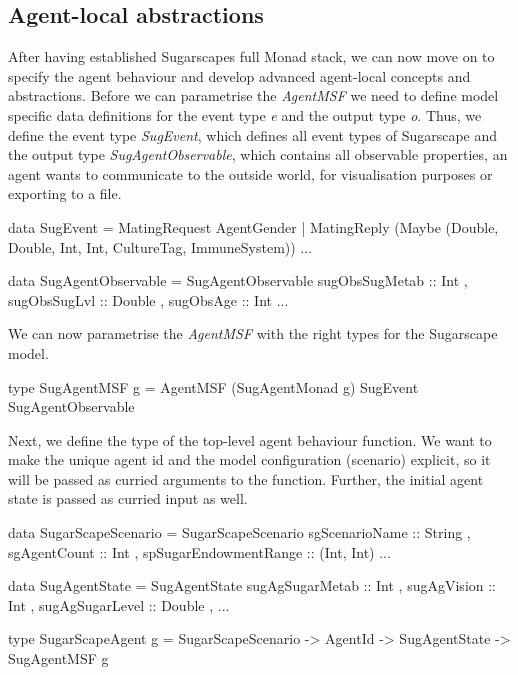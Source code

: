 \subsection{Agent-local abstractions}
After having established Sugarscapes full Monad stack, we can now move on to specify the agent behaviour and develop advanced agent-local concepts and abstractions. Before we can parametrise the \textit{AgentMSF} we need to define model specific data definitions for the event type \textit{e} and the output type \textit{o}. Thus, we define the event type \textit{SugEvent}, which defines all event types of Sugarscape and the output type \textit{SugAgentObservable}, which contains all observable properties, an agent wants to communicate to the outside world, for visualisation purposes or exporting to a file. 

\begin{HaskellCode}
data SugEvent = MatingRequest AgentGender
              | MatingReply 
                 (Maybe (Double, Double, Int, Int, CultureTag, ImmuneSystem))
              ...

data SugAgentObservable = SugAgentObservable
  { sugObsSugMetab :: Int
  , sugObsSugLvl   :: Double
  , sugObsAge      :: Int
  ...  
  }
\end{HaskellCode}

We can now parametrise the \textit{AgentMSF} with the right types for the Sugarscape model.

\begin{HaskellCode}
type SugAgentMSF g = AgentMSF (SugAgentMonad g) SugEvent SugAgentObservable
\end{HaskellCode}

Next, we define the type of the top-level agent behaviour function. We want to make the unique agent id and the model configuration (scenario) explicit, so it will be passed as curried arguments to the function. Further, the initial agent state is passed as curried input as well.

\begin{HaskellCode}
data SugarScapeScenario = SugarScapeScenario 
  { sgScenarioName        :: String
  , sgAgentCount          :: Int
  , spSugarEndowmentRange :: (Int, Int)
  ...
  }

data SugAgentState = SugAgentState
  { sugAgSugarMetab :: Int
  , sugAgVision     :: Int
  , sugAgSugarLevel :: Double
  , ...
  }
  
type SugarScapeAgent g 
  = SugarScapeScenario -> AgentId -> SugAgentState -> SugAgentMSF g
\end{HaskellCode}

